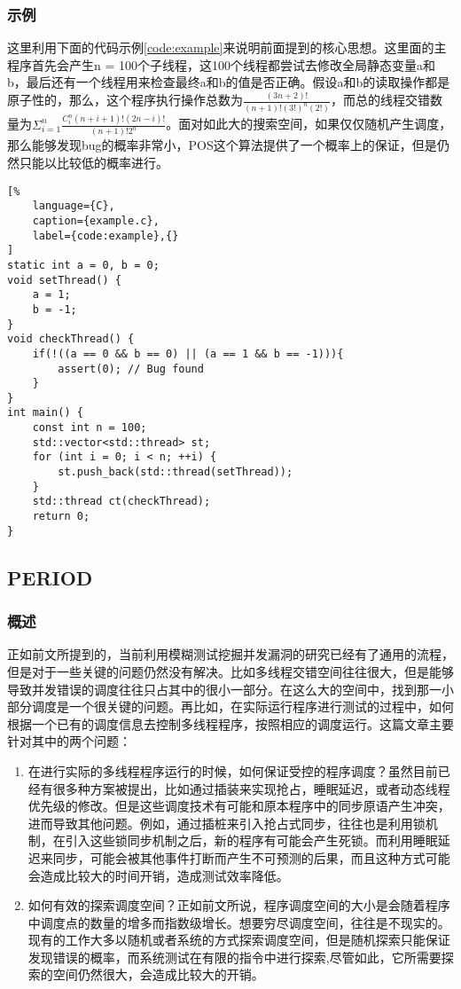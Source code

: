 \subsubsection{示例}

这里利用下面的代码示例\autoref{code:example}来说明前面提到的核心思想。这里面的主程序首先会产生n = 100个子线程，这100个线程都尝试去修改全局静态变量a和b，最后还有一个线程用来检查最终a和b的值是否正确。假设a和b的读取操作都是原子性的，那么，这个程序执行操作总数为$\frac{(3n+2)!}{(n+1)!(3!)^n(2!)}$，而总的线程交错数量为$\Sigma^n_{i=1}\frac{C_i^n(n+i+1)!(2n-i)!}{(n+1)!2^n}$。面对如此大的搜索空间，如果仅仅随机产生调度，那么能够发现bug的概率非常小，POS这个算法提供了一个概率上的保证，但是仍然只能以比较低的概率进行。

\begin{spacing}{1.0}
\begin{lstlisting}[%
    language={C},
    caption={example.c},
    label={code:example},{}
]
static int a = 0, b = 0;
void setThread() {
    a = 1;
    b = -1;
}
void checkThread() {
    if(!((a == 0 && b == 0) || (a == 1 && b == -1))){
        assert(0); // Bug found
    }
}
int main() {
    const int n = 100;
    std::vector<std::thread> st;
    for (int i = 0; i < n; ++i) {
        st.push_back(std::thread(setThread));
    }
    std::thread ct(checkThread);
    return 0;
}
\end{lstlisting}
\end{spacing}

\subsection{PERIOD}

\subsubsection{概述}

正如前文所提到的，当前利用模糊测试挖掘并发漏洞的研究已经有了通用的流程，但是对于一些关键的问题仍然没有解决。比如多线程交错空间往往很大，但是能够导致并发错误的调度往往只占其中的很小一部分。在这么大的空间中，找到那一小部分调度是一个很关键的问题。再比如，在实际运行程序进行测试的过程中，如何根据一个已有的调度信息去控制多线程程序，按照相应的调度运行。这篇文章主要针对其中的两个问题：

\begin{enumerate}
\item 在进行实际的多线程程序运行的时候，如何保证受控的程序调度？虽然目前已经有很多种方案被提出，比如通过插装来实现抢占，睡眠延迟，或者动态线程优先级的修改。但是这些调度技术有可能和原本程序中的同步原语产生冲突，进而导致其他问题。例如，通过插桩来引入抢占式同步，往往也是利用锁机制，在引入这些锁同步机制之后，新的程序有可能会产生死锁。而利用睡眠延迟来同步，可能会被其他事件打断而产生不可预测的后果，而且这种方式可能会造成比较大的时间开销，造成测试效率降低。
\item 如何有效的探索调度空间？正如前文所说，程序调度空间的大小是会随着程序中调度点的数量的增多而指数级增长。想要穷尽调度空间，往往是不现实的。现有的工作大多以随机或者系统的方式探索调度空间，但是随机探索只能保证发现错误的概率，而系统测试在有限的指令中进行探索,尽管如此，它所需要探索的空间仍然很大，会造成比较大的开销。
\end{enumerate}

